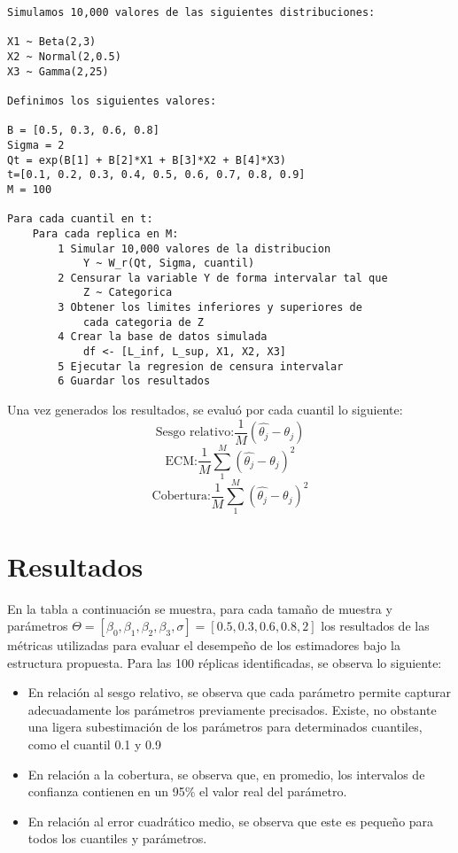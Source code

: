 \begin{lstlisting}
Simulamos 10,000 valores de las siguientes distribuciones:

X1 ~ Beta(2,3) 
X2 ~ Normal(2,0.5)
X3 ~ Gamma(2,25)

Definimos los siguientes valores:

B = [0.5, 0.3, 0.6, 0.8] 
Sigma = 2
Qt = exp(B[1] + B[2]*X1 + B[3]*X2 + B[4]*X3)
t=[0.1, 0.2, 0.3, 0.4, 0.5, 0.6, 0.7, 0.8, 0.9]
M = 100

Para cada cuantil en t:
	Para cada replica en M:
		1 Simular 10,000 valores de la distribucion 
			Y ~ W_r(Qt, Sigma, cuantil)
		2 Censurar la variable Y de forma intervalar tal que
			Z ~ Categorica
		3 Obtener los limites inferiores y superiores de
			cada categoria de Z
		4 Crear la base de datos simulada
			df <- [L_inf, L_sup, X1, X2, X3]
		5 Ejecutar la regresion de censura intervalar
		6 Guardar los resultados
\end{lstlisting}


Una vez generados los resultados, se evaluó por cada cuantil lo siguiente:
\[ \text{Sesgo relativo:} \frac{1}{M}(\hat{\theta_j} - \theta_j)\]
\[ \text{ECM:} \frac{1}{M} \sum_1^M (\hat{\theta_j} - \theta_j)^2 \]
\[ \text{Cobertura:} \frac{1}{M} \sum_1^M (\hat{\theta_j} - \theta_j)^2 \]

\section{Resultados}

En la tabla a continuación se muestra, para cada tamaño de muestra y parámetros $\Theta = [\beta_0,\beta_1,\beta_2,\beta_3,\sigma] = [0.5, 0.3, 0.6, 0.8, 2]$ los resultados de las métricas utilizadas para evaluar el desempeño de los estimadores bajo la estructura propuesta. Para las 100 réplicas identificadas, se observa lo siguiente:

\begin{itemize}
	\item En relación al sesgo relativo, se observa que cada parámetro permite capturar adecuadamente los parámetros previamente precisados. Existe, no obstante una ligera subestimación de los parámetros para determinados cuantiles, como el cuantil 0.1 y 0.9
	\item En relación a la cobertura, se observa que, en promedio, los intervalos de confianza contienen en un 95\% el valor real del parámetro.
	\item En relación al error cuadrático medio, se observa que este es pequeño para todos los cuantiles y parámetros.
\end{itemize}

